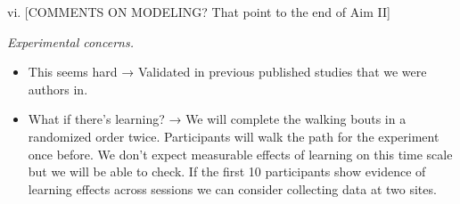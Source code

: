 vi. {[}COMMENTS ON MODELING? That point to the end of Aim II{]}

\emph{Experimental concerns.}

\begin{itemize}
\item
  This seems hard → Validated in previous published studies that we were
  authors in.
\item
  What if there's learning? → We will complete the walking bouts in a
  randomized order twice. Participants will walk the path for the
  experiment once before. We don't expect measurable effects of learning
  on this time scale but we will be able to check. If the first 10
  participants show evidence of learning effects across sessions we can
  consider collecting data at two sites.
\end{itemize}
